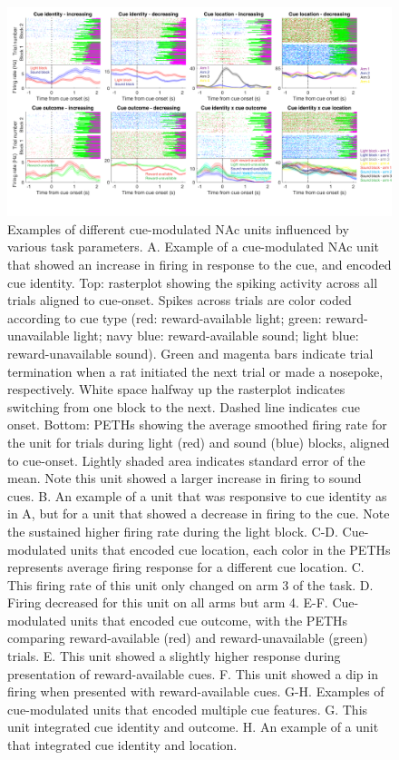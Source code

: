 \documentclass[11pt]{article}
\begin{document}
\begin{figure}[h]
\centering
\includegraphics[width=\textwidth]{Fig 5 - Neural examples.png}
\caption{Examples of different cue-modulated NAc units influenced by various task parameters. A. Example of a cue-modulated NAc unit that showed an increase in firing in response to the cue, and encoded cue identity. Top: rasterplot showing the spiking activity across all trials aligned to cue-onset. Spikes across trials are color coded according to cue type (red: reward-available light; green: reward-unavailable light; navy blue: reward-available sound; light blue: reward-unavailable sound). Green and magenta bars indicate trial termination when a rat initiated the next trial or made a nosepoke, respectively. White space halfway up the rasterplot indicates switching from one block to the next. Dashed line indicates cue onset. Bottom: PETHs showing the average smoothed firing rate for the unit for trials during light (red) and sound (blue) blocks, aligned to cue-onset. Lightly shaded area indicates standard error of the mean. Note this unit showed a larger increase in firing to sound cues. B. An example of a unit that was responsive to cue identity as in A, but for a unit that showed a decrease in firing to the cue. Note the sustained higher firing rate during the light block. C-D. Cue-modulated units that encoded cue location, each color in the PETHs represents average firing response for a different cue location. C. This firing rate of this unit only changed on arm 3 of the task. D. Firing decreased for this unit on all arms but arm 4. E-F. Cue-modulated units that encoded cue outcome, with the PETHs comparing reward-available (red) and reward-unavailable (green) trials. E. This unit showed a slightly higher response during presentation of reward-available cues. F. This unit showed a dip in firing when presented with reward-available cues. G-H. Examples of cue-modulated units that encoded multiple cue features. G. This unit integrated cue identity and outcome. H. An example of a unit that integrated cue identity and location.}
\label{fig:examples}
\end{figure}
\end{document}

